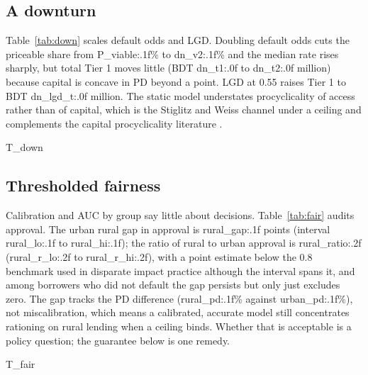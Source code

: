 \documentclass[11pt,a4paper]{article}
\newcommand{\tabsize}{\footnotesize}
\begin{document}
\subsection{A downturn}
Table~\ref{tab:down} scales default odds and LGD. Doubling default odds cuts the priceable share from {{P_viable:.1f}}\% to {{dn_v2:.1f}}\% and the median rate rises sharply, but total Tier 1 moves little (BDT {{dn_t1:.0f}} to {{dn_t2:.0f}} million) because capital is concave in PD beyond a point. LGD at 0.55 raises Tier 1 to BDT {{dn_lgd_t:.0f}} million. The static model understates procyclicality of access rather than of capital, which is the Stiglitz and Weiss channel under a ceiling and complements the capital procyclicality literature \citep{Repullo2014,Behn2016,Gordy2010}.
\begin{table}[H]\centering\tabsize\caption{Downturn scenarios (Platt PD).}\label{tab:down}
{{T_down}}\end{table}

\subsection{Thresholded fairness}
Calibration and AUC by group say little about decisions. Table~\ref{tab:fair} audits approval. The urban rural gap in approval is {{rural_gap:.1f}} points (interval {{rural_lo:.1f}} to {{rural_hi:.1f}}); the ratio of rural to urban approval is {{rural_ratio:.2f}} ({{rural_r_lo:.2f}} to {{rural_r_hi:.2f}}), with a point estimate below the 0.8 benchmark used in disparate impact practice although the interval spans it, and among borrowers who did not default the gap persists but only just excludes zero. The gap tracks the PD difference ({{rural_pd:.1f}}\% against {{urban_pd:.1f}}\%), not miscalibration, which means a calibrated, accurate model still concentrates rationing on rural lending when a ceiling binds. Whether that is acceptable is a policy question; the guarantee below is one remedy.
\begin{table}[H]\centering\tabsize\caption{Approval gaps under the RAROC screen with 95\% bootstrap intervals. Impact ratio is lowest over highest group approval.}\label{tab:fair}
{{T_fair}}\end{table}
\end{document}
